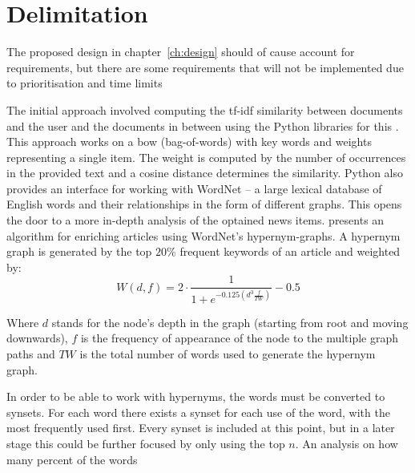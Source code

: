 %
\section{Delimitation}
The proposed design in chapter~\vref{ch:design} should of cause account for requirements, but there are some requirements that will not be implemented due to prioritisation and time limits

The initial approach involved computing the tf-idf similarity between documents and the user and the documents in between using the Python libraries for this \cite{NLTK}. This approach works on a bow (bag-of-words) with key words and weights representing a single item. The weight is computed by the number of occurrences in the provided text and a cosine distance determines the similarity. Python also provides an interface for working with WordNet -- a large lexical database of English words and their relationships in the form of different graphs. This opens the door to a more in-depth analysis of the optained news items. \cite{116262780379.pdf} presents an algorithm for enriching articles using WordNet's hypernym-graphs. A hypernym graph is generated by the top $20\%$ frequent keywords of an article and weighted by:
$$W(d, f) = 2 \cdot \frac{1}{1+e^{-0.125(d^3\frac{f}{TW})}}-0.5$$

Where $d$ stands for the node's depth in the graph (starting from root and moving downwards), $f$ is the frequency of appearance of the node to the multiple graph paths and $TW$ is the total number of words used to generate the hypernym graph.

In order to be able to work with hypernyms, the words must be converted to synsets. For each word there exists a synset for each use of the word, with the most frequently used first. Every synset is included at this point, but in a later stage this could be further focused by only using the top $n$. An analysis on how many percent of the words


